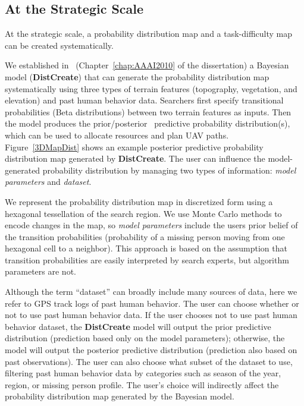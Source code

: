 \subsection{At the Strategic Scale}

At the strategic scale, a probability distribution map and a task-difficulty map can be created systematically.

We established in~\cite{Lin2010Bayesian} (Chapter~\ref{chap:AAAI2010} of the dissertation) a Bayesian model (\textbf{DistCreate}) that can generate the probability distribution map systematically using three types of terrain features (topography, vegetation, and elevation) and past human behavior data. Searchers first specify transitional probabilities (Beta distributions) between two terrain features as inputs. Then the model produces the prior/posterior~\cite{Russell2009Artificial} predictive probability distribution(s), which can be used to allocate resources and plan UAV paths. Figure~\ref{3DMapDist} shows an example posterior predictive probability distribution map generated by \textbf{DistCreate}. The user can influence the model-generated probability distribution by managing two types of information: \textit{model parameters} and \textit{dataset}. 

We represent the probability distribution map in discretized form using a hexagonal tessellation of the search region. We use Monte Carlo methods to encode changes in the map, so \textit{model parameters} include the users prior belief of the transition probabilities (probability of a missing person moving from one hexagonal cell to a neighbor). This approach is based on the assumption that transition probabilities are easily interpreted by search experts, but algorithm parameters are not. 

Although the term ``dataset'' can broadly include many sources of data, here we refer to GPS track logs of past human behavior. The user can choose whether or not to use past human behavior data. If the user chooses not to use past human behavior dataset, the \textbf{DistCreate} model will output the prior predictive distribution (prediction based only on the model parameters); otherwise, the model will output the posterior predictive distribution (prediction also based on past observations). The user can also choose what subset of the dataset to use, filtering past human behavior data by categories such as season of the year, region, or missing person profile. The user's choice will indirectly affect the probability distribution map generated by the Bayesian model.

